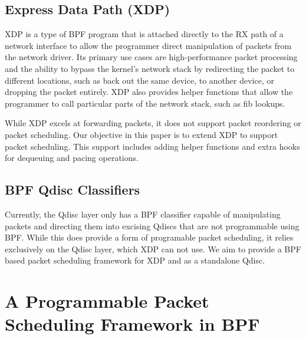 \documentclass[sigconf, nonacm]{acmart}
\begin{document}
\subsection{Express Data Path (XDP)} \label{sec:xdp}

XDP\cite{hoiland2018express} is a type of BPF program that is attached directly to the RX path of a network interface to allow the programmer direct manipulation of packets from the network driver. Its primary use cases are high-performance packet processing and the ability to bypass the kernel's network stack by redirecting the packet to different locations, such as back out the same device, to another device, or dropping the packet entirely. XDP also provides helper functions that allow the programmer to call particular parts of the network stack, such as fib lookups.

While XDP excels at forwarding packets, it does not support packet reordering or packet scheduling. Our objective in this paper is to extend XDP to support packet scheduling. This support includes adding helper functions and extra hooks for dequeuing and pacing operations.


\subsection{BPF Qdisc Classifiers}

Currently, the Qdisc layer only has a BPF classifier capable of manipulating packets and directing them into excising Qdiscs that are not programmable using BPF. While this does provide a form of programable packet scheduling, it relies exclusively on the Qdisc layer, which XDP can not use. We aim to provide a BPF based packet scheduling framework for XDP and as a standalone Qdisc.


\section{A Programmable Packet Scheduling Framework in BPF}
\end{document}

